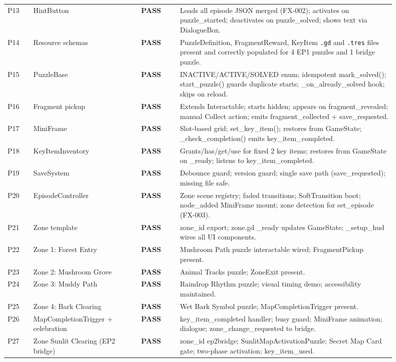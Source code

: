 \documentclass[12pt, a4paper]{article}
\newcommand{\statuspass}{\textcolor{passgre}{\textbf{PASS}}}
\begin{document}
\begin{longtable}{p{0.06\linewidth} p{0.25\linewidth} p{0.09\linewidth} p{0.50\linewidth}}
P13 & HintButton & \statuspass & Loads all episode JSON merged (FX-002); activates on puzzle\_started; deactivates on puzzle\_solved; shows text via DialogueBox. \\
P14 & Resource schemas & \statuspass & PuzzleDefinition, FragmentReward, KeyItem \texttt{.gd} and \texttt{.tres} files present and correctly populated for 4 EP1 puzzles and 1 bridge puzzle. \\
P15 & PuzzleBase & \statuspass & INACTIVE/ACTIVE/SOLVED enum; idempotent mark\_solved(); start\_puzzle() guards duplicate starts; \_on\_already\_solved hook; skips on reload. \\
P16 & Fragment pickup & \statuspass & Extends Interactable; starts hidden; appears on fragment\_revealed; manual Collect action; emits fragment\_collected + save\_requested. \\
P17 & MiniFrame & \statuspass & Slot-based grid; set\_key\_item(); restores from GameState; \_check\_completion() emits key\_item\_completed. \\
P18 & KeyItemInventory & \statuspass & Grants/has/get/use for fixed 2 key items; restores from GameState on \_ready; listens to key\_item\_completed. \\
P19 & SaveSystem & \statuspass & Debounce guard; version guard; single save path (save\_requested); missing file safe. \\
P20 & EpisodeController & \statuspass & Zone scene registry; faded transitions; SoftTransition boot; node\_added MiniFrame mount; zone detection for set\_episode (FX-003). \\
P21 & Zone template & \statuspass & zone\_id export; zone.gd \_ready updates GameState; \_setup\_hud wires all UI components. \\
P22 & Zone 1: Forest Entry & \statuspass & Mushroom Path puzzle interactable wired; FragmentPickup present. \\
P23 & Zone 2: Mushroom Grove & \statuspass & Animal Tracks puzzle; ZoneExit present. \\
P24 & Zone 3: Muddy Path & \statuspass & Raindrop Rhythm puzzle; visual timing demo; accessibility maintained. \\
P25 & Zone 4: Bark Clearing & \statuspass & Wet Bark Symbol puzzle; MapCompletionTrigger present. \\
P26 & MapCompletionTrigger + celebration & \statuspass & key\_item\_completed handler; busy guard; MiniFrame animation; dialogue; zone\_change\_requested to bridge. \\
P27 & Zone Sunlit Clearing (EP2 bridge) & \statuspass & zone\_id ep2bridge; SunlitMapActivationPuzzle; Secret Map Card gate; two-phase activation; key\_item\_used. \\

\end{longtable}
\end{document}
